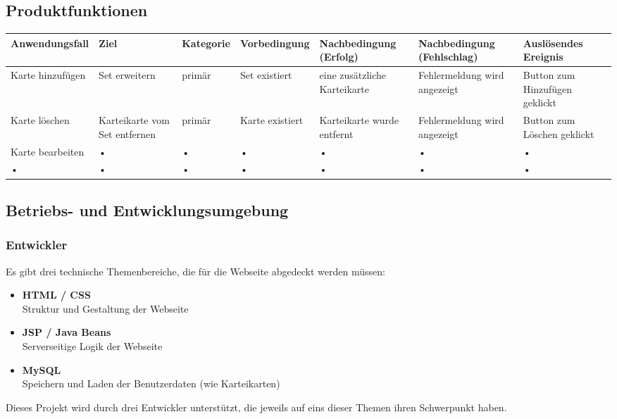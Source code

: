 \begin{landscape}
\begin{center}
\subsection{Produktfunktionen}


\begin{tabulary}{1.3\textwidth}{|L|L|L|L|L|L|L|}
\hline 
\textbf{Anwendungsfall} & \textbf{Ziel} & \textbf{Kategorie} & \textbf{Vorbedingung} & \textbf{Nachbedingung (Erfolg)} & \textbf{Nachbedingung (Fehlschlag)} & \textbf{Auslösendes Ereignis} \\ 
\hline 
Karte hinzufügen & Set erweitern & primär & Set existiert & eine zusätzliche Karteikarte & Fehlermeldung wird angezeigt & Button zum Hinzufügen geklickt \\ 
\hline 
Karte löschen & Karteikarte vom Set entfernen & primär & Karte existiert & Karteikarte wurde entfernt & Fehlermeldung wird angezeigt & Button zum Löschen geklickt \\ 
\hline 
Karte bearbeiten & • & • & • & • & • & • \\ 
\hline 
• & • & • & • & • & • & • \\ 
\hline 
\end{tabulary} 
\end{center}
\end{landscape}
\restoregeometry

\subsection{Betriebs- und Entwicklungsumgebung}

\subsubsection{Entwickler}
Es gibt drei technische Themenbereiche, die für die Webseite abgedeckt werden müssen:
\begin{itemize}
	\item \textbf{HTML / CSS} \\
	Struktur und Gestaltung der Webseite
	\item \textbf{JSP / Java Beans} \\
	Serverseitige Logik der Webseite
	\item \textbf{MySQL} \\
	Speichern und Laden der Benutzerdaten (wie Karteikarten)
\end{itemize}
Dieses Projekt wird durch drei Entwickler unterstützt, die jeweils auf eins dieser Themen ihren Schwerpunkt haben.


